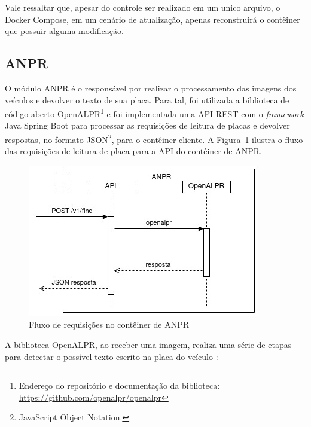 \documentclass[12pt]{article}
\begin{document}
Vale ressaltar que, apesar do controle ser realizado em um unico arquivo, o Docker Compose, em um cenário de atualização, apenas reconstruirá o contêiner que possuir alguma modificação.

\subsection{ANPR}

O módulo ANPR é o responsável por realizar o processamento das imagens dos veículos e devolver o texto de sua placa. Para tal, foi utilizada a biblioteca de código-aberto OpenALPR\footnote{Endereço do repositório e documentação da biblioteca: \url{https://github.com/openalpr/openalpr}} e foi implementada uma API REST com o \textit{framework} Java Spring Boot para processar as requisições de leitura de placas e devolver respostas, no formato JSON\footnote{JavaScript Object Notation.}, para o contêiner cliente. A Figura~\ref{fig:anpr4j-data} ilustra o fluxo das requisições de leitura de placa para a API do contêiner de ANPR.

\begin{figure}[ht]
	\centering
	\includegraphics[width=.8\textwidth]{anpr4j-data.jpg}
	\caption{Fluxo de requisições no contêiner de ANPR}
	\label{fig:anpr4j-data}
\end{figure}

A biblioteca OpenALPR, ao receber uma imagem, realiza uma série de etapas para detectar o possível texto escrito na placa do veículo \cite{openalprdesign}:
\end{document}
